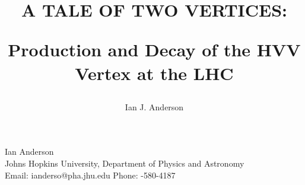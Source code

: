 \documentclass[12pt,oneside,final]{thesis}
\begin{document}
\title{
\begin{Large}
A TALE OF TWO VERTICES: \\
\end{Large}
Production and Decay of the HVV Vertex at the LHC
}
\author{Ian J. Anderson}
\degreemonth{}
\dissertation
\doctorphilosophy
\copyrightnotice









%





\pagebreak
\begin{cv}{{\large Ian Anderson}\\
    {\normalsize Johns Hopkins University, 
      Department of Physics and Astronomy\\
      Email: ianderso@pha.jhu.edu
      \hfill Phone: {-580-4187} 
    }
}

\end{cv}
\end{document}
